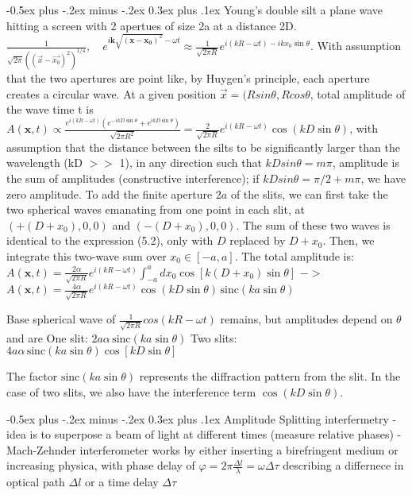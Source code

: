 \documentclass[a4paper,11pt,portrait]{article}
\makeatletter
\renewcommand{\subsection}{\@startsection{subsection}{2}{0mm}%
                                {-0.5ex plus -.2ex minus -.2ex}%
                                {0.3ex plus .1ex}%
                                {\normalfont\footnotesize\bfseries}}
\makeatother
\begin{document}
\begin{multicols}{3}
\subsection{Young's double silt}
a plane wave hitting a screen with 2 apertues of size 2a at a distance 2D. 
$\frac{1}{\sqrt{2\pi} \left( (\overrightarrow{x} - \overrightarrow{x_0})^2 \right)^{1/4}}, \quad e^{i \mathbf{k} \sqrt{(\mathbf{x} - \mathbf{x_0})^2} - \omega t} \approx \frac{1}{\sqrt{2 \pi R}} e^{i(kR - \omega t)- i k x_0 \sin \theta} $. With assumption that the two apertures are point like, by Huygen's principle, each aperture creates a circular wave. At a given position $\overrightarrow{x} = (R sin \theta, R cos \theta$, total amplitude of the wave time t is $A(\mathbf{x}, t) \propto \frac{e^{i(kR - \omega t)} \left( e^{-ikD \sin \theta} + e^{ikD \sin \theta} \right)}{\sqrt{2\pi R^2}} = \frac{2}{\sqrt{2 \pi R}} e^{i(kR - \omega t)} \cos(kD \sin \theta)$, with assumption that the distance between the silts to be significantly larger than the wavelength (kD $>>$ 1), in any direction such that $kD sin \theta = m \pi$, amplitude is the sum of amplitudes (constructive interference); if $kD sin \theta = \pi / 2 + m\pi$, we have zero amplitude. 
To add the finite aperture \( 2a \) of the slits, we can first take the two spherical waves emanating from one point in each slit, at \( (+ (D + x_0), 0, 0) \) and \( (- (D + x_0), 0, 0) \). The sum of these two waves is identical to the expression (5.2), only with \( D \) replaced by \( D + x_0 \). Then, we integrate this two-wave sum over \( x_0 \in [-a, a] \). The total amplitude is: $A(\mathbf{x}, t) = \frac{2\alpha}{\sqrt{2\pi R}} e^{i(kR - \omega t)} \int_{-a}^{a} dx_0 \cos \left[k(D + x_0) \sin \theta \right]$ $->$ $
A(\mathbf{x}, t) = \frac{4\alpha}{\sqrt{2\pi R}} e^{i(kR - \omega t)} \cos \left(kD \sin \theta \right) \, \text{sinc}(ka \sin \theta)$

Base spherical wave of $\frac{1}{\sqrt{2 \pi R}} cos (kR - \omega t)$ remains, but amplitudes depend on $\theta$ and are
One slit: $2a\alpha \, \text{sinc}(ka \sin \theta)$
Two slits: $4a\alpha \, \text{sinc}(ka \sin \theta) \cos \left[kD \sin \theta \right]$

The factor \( \text{sinc}(ka \sin \theta) \) represents the diffraction pattern from the slit. In the case of two slits, we also have the interference term \( \cos(kD \sin \theta) \).

\subsection{Amplitude Splitting interfermetry} - idea is to superpose a beam of light at different times (measure relative phases) - Mach-Zehnder interferometer works by either inserting a birefringent medium or increasing physica, with phase delay of $\varphi = 2 \pi \frac{\Delta l}{\lambda} = \omega \Delta \tau$ describing a differnece in optical path $\Delta l$ or a time delay $\Delta \tau$


\end{multicols}
\end{document}
